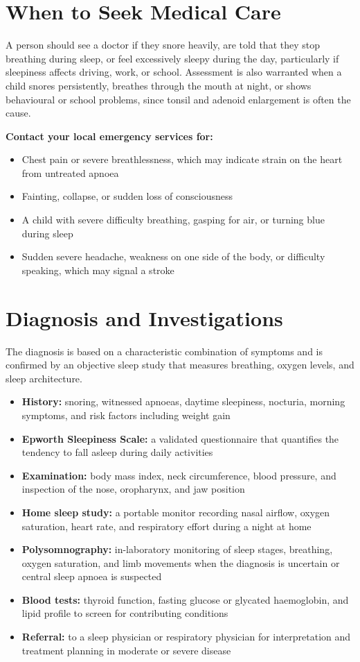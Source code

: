 \section*{When to Seek Medical Care}
A person should see a doctor if they snore heavily, are told that they stop breathing during sleep, or feel excessively sleepy during the day, particularly if sleepiness affects driving, work, or school. Assessment is also warranted when a child snores persistently, breathes through the mouth at night, or shows behavioural or school problems, since tonsil and adenoid enlargement is often the cause.

\textbf{Contact your local emergency services for:}
\begin{itemize}
    \item Chest pain or severe breathlessness, which may indicate strain on the heart from untreated apnoea
    \item Fainting, collapse, or sudden loss of consciousness
    \item A child with severe difficulty breathing, gasping for air, or turning blue during sleep
    \item Sudden severe headache, weakness on one side of the body, or difficulty speaking, which may signal a stroke
\end{itemize}

\section*{Diagnosis and Investigations}
The diagnosis is based on a characteristic combination of symptoms and is confirmed by an objective sleep study that measures breathing, oxygen levels, and sleep architecture.

\begin{itemize}
    \item \textbf{History:} snoring, witnessed apnoeas, daytime sleepiness, nocturia, morning symptoms, and risk factors including weight gain
    \item \textbf{Epworth Sleepiness Scale:} a validated questionnaire that quantifies the tendency to fall asleep during daily activities
    \item \textbf{Examination:} body mass index, neck circumference, blood pressure, and inspection of the nose, oropharynx, and jaw position
    \item \textbf{Home sleep study:} a portable monitor recording nasal airflow, oxygen saturation, heart rate, and respiratory effort during a night at home
    \item \textbf{Polysomnography:} in-laboratory monitoring of sleep stages, breathing, oxygen saturation, and limb movements when the diagnosis is uncertain or central sleep apnoea is suspected
    \item \textbf{Blood tests:} thyroid function, fasting glucose or glycated haemoglobin, and lipid profile to screen for contributing conditions
    \item \textbf{Referral:} to a sleep physician or respiratory physician for interpretation and treatment planning in moderate or severe disease
\end{itemize}


